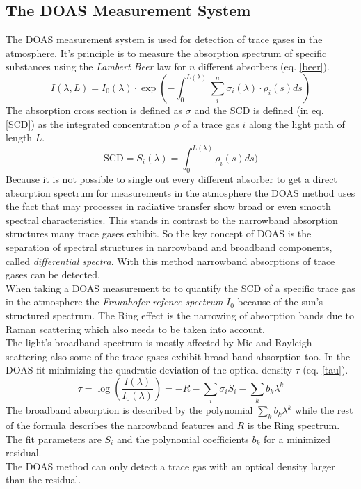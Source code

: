 \documentclass[12pt, english]{scrartcl} %
\begin{document}
\begin{multicols}{2}
 \subsection{The DOAS Measurement System}
The DOAS measurement system is used for detection of trace gases in the atmosphere. It's principle is to measure the absorption spectrum of specific substances using the \textit{Lambert Beer} law for $n$ different absorbers (eq. \ref{beer}).
\begin{equation}\label{beer}
I(\lambda, L) = I_0(\lambda) \cdot \exp (- \int^{L(\lambda)}_0 \sum_i^n \sigma_i(\lambda) \cdot \rho_i(s) ds)
\end{equation}
The absorption cross section is defined as $\sigma$ and the SCD is defined (in eq. \ref{SCD}) as the integrated concentration $\rho$ of a trace gas $i$ along the light path of length $L$.
\begin{equation}\label{SCD}
\text{SCD} = S_i(\lambda) =\int^{L(\lambda)}_0  \rho_i(s) ds)
\end{equation}
Because it is not possible to single out every different absorber to get a direct absorption spectrum for measurements in the atmosphere the DOAS method uses the fact that may processes in radiative transfer show broad or even smooth spectral characteristics. This stands in contrast to the narrowband absorption structures many trace gases exhibit. So the key concept of DOAS is the separation of spectral structures in narrowband and broadband components, called \textit{differential spectra}. With this method narrowband absorptions of trace gases can be detected.\\
When taking a DOAS measurement to to quantify the SCD of a specific trace gas in the atmosphere the \textit{Fraunhofer refence spectrum} $I_0$ because of the sun's structured spectrum. The Ring effect is the narrowing of absorption bands due to Raman scattering which also needs to be taken into account.\\
The light's broadband spectrum is mostly affected by Mie and Rayleigh scattering also some of the trace gases exhibit broad band absorption too. In the DOAS fit minimizing the quadratic deviation of the optical density $\tau$ (eq. \ref{tau}).
\begin{equation}\label{tau}
\tau = \log (\frac{I(\lambda)}{I_0(\lambda) }) = -R -\sum_i \sigma_i S_i - \sum_k b_k \lambda^k
\end{equation}
The broadband absorption is described by the polynomial $\sum_k b_k \lambda^k$ while the rest of the formula describes the narrowband features and $R$ is the Ring spectrum. The fit parameters are $S_i$ and the polynomial coefficients $b_k$ for a minimized residual.\\
The DOAS method can only detect a trace gas with an optical density larger than the residual.

\end{multicols}
\end{document}

